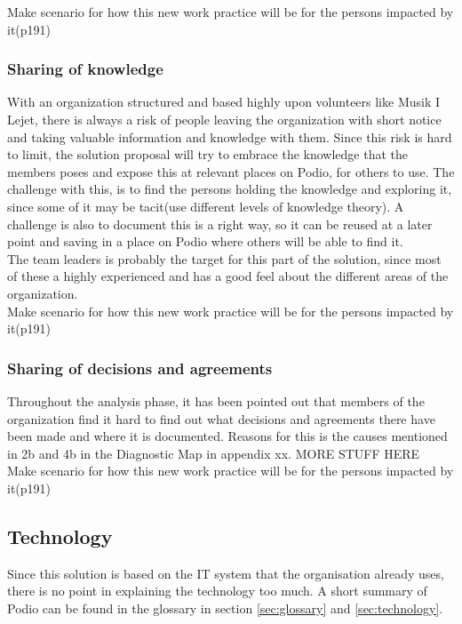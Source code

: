 Make scenario for how this new work practice will be for the persons impacted by it(p191)
  
\subsubsection{Sharing of knowledge}
With an organization structured and based highly upon volunteers like Musik I Lejet, there is always a risk of people leaving the organization with short notice and taking valuable information and knowledge with them. Since this risk is hard to limit, the solution proposal will try to embrace the knowledge that the members poses and expose this at relevant places on Podio, for others to use. The challenge with this, is to find the persons holding the knowledge and exploring it, since some of it may be tacit(use different levels of knowledge theory). A challenge is also to document this is a right way, so it can be reused at a later point and saving in a place on Podio where others will be able to find it.\\
The team leaders is probably the target for this part of the solution, since most of these a highly experienced and has a good feel about the different areas of the organization.\\

Make scenario for how this new work practice will be for the persons impacted by it(p191)

\subsubsection{Sharing of decisions and agreements}
Throughout the analysis phase, it has been pointed out that members of the organization find it hard to find out what decisions and agreements there have been made and where it is documented. Reasons for this is the causes mentioned in 2b and 4b in the Diagnostic Map in appendix xx. MORE STUFF HERE\\ 
Make scenario for how this new work practice will be for the persons impacted by it(p191)

\subsection{Technology}
Since this solution is based on the IT system that the organisation already uses, there is no point
in explaining the technology too much. A short summary of Podio can be found in the glossary in
section \ref{sec:glossary} and \ref{sec:technology}.

